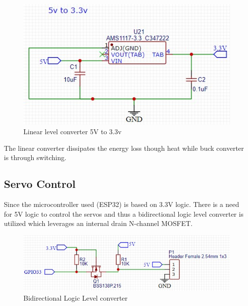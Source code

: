 \begin{center}
	\begin{figure}[H]
	\centering
	\includegraphics{Figures/5233}
	\caption[Linear Voltage Converter]{Linear level converter 5V to 3.3v}
	\end{figure}
\end{center}

The linear converter dissipates the energy loss though heat while buck converter is through switching.

\subsection{Servo Control}
Since the microcontroller used (ESP32) is based on 3.3V logic. There is a need for 5V logic to control the servos and thus a bidirectional logic level converter is utilized which leverages an internal drain N-channel MOSFET. 
\begin{center}
	\begin{figure}[H]
	\centering
	\includegraphics{Figures/logik}
	\caption[Bidirectional Logic Level converter]{Bidirectional Logic Level converter}
	\end{figure}
\end{center}
